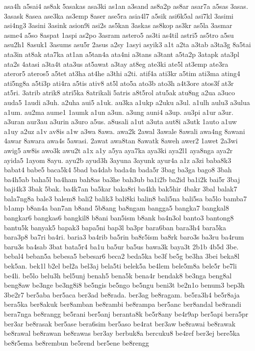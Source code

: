 {asa4h a5sai4 as8ak 5asakas asa3ki as1an a3sand as8a2p as8ar asar7a a5sas
3asas. 3asask 8asea ase3ka as3emp 8aser ase5ra asia4l7 a5sik asi6k5al
asi7kl 3asimi asi4ng3 3asini 3asink asion9i asi2s as5kan 3askas as8kop
as3kr as5la 3asmar asme4 a5so 8aspat 1aspi as2po 3asram astero5 as3ti
as4til astri5 as5tro a5su asu2h1 8asuk1 3asums asu5r 2asus a2sy 1asyi
asyik3 a1t a2ta a3tab a3ta3g 8a5tai ata3in at8ak ata7ka at1an a5tan4a
ata4ni a3tans a3tant a5ta2p 3atapk ata3pl ata2s 4atasi a3ta4t ata3us
at5awat a3tay at8eg ate3ki ate5l at3emp ate3ra ateror5 ateros5 a5tet at3ha
at4he a3thi a2ti. atif4a ati3kr a5tim ati3ma ating4 ati5ng8a a5ti3p ati4ra
a5tis ativ8 at5l ato5a ato3b ato3h a4t3ore atos3f at3r at5ri. 3atrib
atrik8 atri5ka 8atrikali 5atris a8t5rol atu5ak atu8ng a2ua a3uco auda5
1audi a3uh. a2uha aui5 a1uk. au3ka a1ukp a2uku a3ul. a1ulh aulu3 a3ulua
a1um. au2ma aume1 1aumk a1un a3un. a3ung auni4 a3up. au3pi a1ur a3ur.
a3uran aur3au a3urin a3uro a5us. a8usali a1ut a3uta aut8i a3utk 1auto a1uw
a1uy a2uz a1v av8is a1w a3wa 8awa. awa2k 2awal 3awale 8awali awa4ng 8awani
4awar 8awara awa4s 5awasi. 2awat awa8tan 8awatk 8aweh awer2 1awet 2a3wi
awig5 aw8is awo3k awu2t a1x a1y a5ya aya7ka aya3ki aya2l1 aya8nga aya2r
ayida5 1ayom 8ayu. ayu2b ayud3h 3ayuna 3ayunk ayur4a a1z a3zi baba8k3
babat4 babe5 baca5k4 5bad ba4dab bada4n bada5r 3bag ba3ga bago8 3bah
ba4h5ab baha5l ba4ham bah8as ba3he bah3ub ba1i2b ba2id ba1i2k bai5r 3baj
baji4k3 3bak 5bak. ba4k7an ba5kar baka8ri ba4kh bak5hir 4bakr 3bal balak7
bala7ng8a bale3 balem8 bali2 balik3 bali8ki balin8 bali5na bali5sa ba5lo
bamba7 b1amp b8an4a ban7an b8and 5b8ang ba8ngam bangga5 bangka7 bangkal8
bangkar6 bangkas6 bangkil8 b8ani ban5ism b8ank ba4n3ol banto3 bantong8
bantu5k banyak5 bapak3 bapa5ni bap3l ba3pr bara6ban bara3h4 bara5ka
bara3p8 ba7ri ba4ri. baria3 ba4rib ba5rin ba8r5ism ba8rk baro3s ba3ru
ba4rum baru3s ba4sab 3bat bata5r4 ba1u ba5ur ba5us bawa3k baya3t 2b1b 4b5d
3be. bebal4 beban5a bebesa5 bebesar6 beca2 beda5ka be3f be5g be3ha 3bei
beka8l bek5an. bek1l b2el bel2a bel3aj bela5ti belek5a be4lem bele5m8a
bele5r be7li be4li. be5lo belu3h bel5unj benah5 bena5k bena4r bendak8
be3nga beng8al beng8aw be3nge be3ng8i8 be5ngis be5ngo be5ngu beni3t be2n1o
benum3 bep3h 3be2r7 ber5aba ber5aca ber3ad be8rada. ber3ag be8ragam.
be5ra3h4 be5r8aja bera5ka ber8akuk ber8amban be8rambi be8rampa ber5anc
ber8andal be8randi bera7nga be8rangg be5rani ber5anj beranta8k be5r8any
be4r9ap ber5api bera5pr ber3ar be8rasak ber5ase bera6sim ber5aso be4rat
ber3aw be8rawai be8rawak be8rawal be8rawan be8rawas ber3ay berbuk8a
bercuku8 be4ref ber3ej bere5ka be8r5ema be8rembun be5rend ber5ene be8rengg
}
